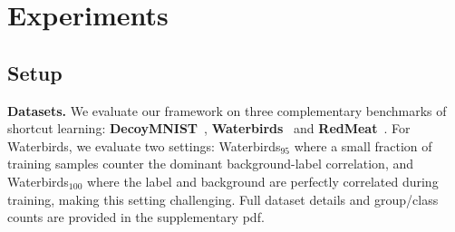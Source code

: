 \section{Experiments}
\label{sec:experiment}


\subsection{Setup}
\label{sec:setup}

\textbf{Datasets.}
We evaluate our framework on three complementary benchmarks of shortcut learning: \textbf{DecoyMNIST}~\cite{erion2021improving},
\textbf{Waterbirds}~\cite{sagawa2019distributionally} and 
\textbf{RedMeat}~\cite{petryk2022guiding}. For Waterbirds, we evaluate two settings: Waterbirds$_{95}$ where a small fraction of training samples counter the dominant background-label correlation, and Waterbirds$_{100}$ where the label and background are perfectly correlated during training, making this setting challenging. Full dataset details and group/class counts are provided in the supplementary pdf.

